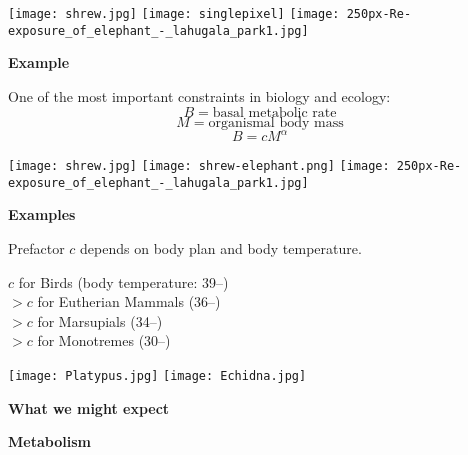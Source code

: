 {  \texttt{[image: shrew.jpg]}
  \hfill
  {
    \texttt{[image: singlepixel]}
  }
  \hfill
  \texttt{[image: 250px-Re-exposure\_of\_elephant\_-\_lahugala\_park1.jpg]}


  \textbf{Example}

One of the most important constraints in biology and ecology:
  $$B = \mbox{basal metabolic rate}$$
  $$M = \mbox{organismal body mass}$$
  $$B = c M^\alpha$$


  \texttt{[image: shrew.jpg]}
  \hfill
  \texttt{[image: shrew-elephant.png]}
  \hfill
  \texttt{[image: 250px-Re-exposure\_of\_elephant\_-\_lahugala\_park1.jpg]}


  \textbf{Examples}

  Prefactor $c$ depends on 
  body plan and body temperature.

  $c$ for Birds (body temperature: 39--)\\
  $> c$ for Eutherian Mammals (36--)\\
  $> c$ for Marsupials  (34--)\\
  $> c$ for Monotremes (30--)

  \begin{center}
    \texttt{[image: Platypus.jpg]}
    \quad
    \texttt{[image: Echidna.jpg]}
  \end{center}





  \textbf{What we might expect} 



  \textbf{Metabolism}

}
